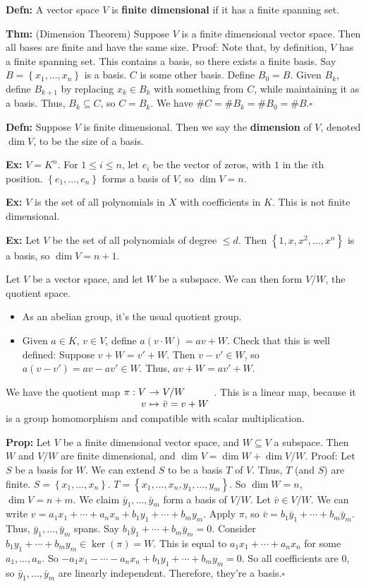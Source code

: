 \documentclass[10pt,letterpaper]{article}
\newcommand{\n}{\hfill\break}
\newcommand{\hangblock}[2]{\par\noindent\settowidth{\hangindent}{\textbf{#1: }}\textbf{#1: }\!\!\!#2}
\newcommand{\defn}[1]{\hangblock{Defn}{#1}}
\newcommand{\thm}[1]{\hangblock{Thm}{#1}}
\newcommand{\prop}[1]{\hangblock{Prop}{#1}}
\newcommand{\ex}[1]{\hangblock{Ex}{#1}}
\newcommand{\proven}{\;$\square$\n}
\newcommand{\set}[1]{\left\{#1\right\}}
\newcommand{\map}[4]{\!\!\!\begin{array}[t]{rcl}#1 & \!\!\!\!\to & \!\!\!\!#2\\ #3 & \!\!\!\!\mapsto & \!\!\!\!#4\end{array}}
\begin{document}
\defn{
	A vector space $V$ is \textbf{finite dimensional} if it has a finite spanning set.\n
}

\thm{
	(Dimension Theorem) Suppose $V$ is a finite dimensional vector space. Then all bases are finite and have the same size.\n
	Proof: Note that, by definition, $V$ has a finite spanning set. This contains a basis, so there exists a finite basis.\n
	Say $B=\set{x_{1},\ldots,x_{n}}$ is a basis. $C$ is some other basis. Define $B_{0}=B$. Given $B_{k}$, define $B_{k+1}$ by replacing $x_{k}\in{}B_{k}$ with something from $C$, while maintaining it as a basis.\n
	Thus, $B_{k}\subseteq{}C$, so $C=B_{k}$. We have $\#C=\#B_{k}=\#B_{0}=\#B$.\proven
}

\defn{
	Suppose $V$ is finite dimensional. Then we say the \textbf{dimension} of $V$, denoted $\dim{}V$, to be the size of a basis.\n
}

\ex{
	$V=K^{n}$. For $1\le{}i\le{}n$, let $e_{i}$ be the vector of zeros, with $1$ in the $i$th position. $\set{e_{1},\ldots,e_{n}}$ forms a basis of $V$, so $\dim{}V=n$.\n
}

\ex{
	$V$ is the set of all polynomials in $X$ with coefficients in $K$. This is not finite dimensional.\n
}

\ex{
	Let $V$ be the set of all polynomials of degree $\le{}d$. Then $\set{1,x,x^{2},\ldots,x^{n}}$ is a basis, so $\dim{}V=n+1$.\n
}

\par\noindent
Let $V$ be a vector space, and let $W$ be a subspace. We can then form $V/W$, the quotient space.
\begin{itemize}
	\item As an abelian group, it's the usual quotient group.
	\item Given $a\in{}K$, $v\in{}V$, define $a(v\cdot{}W)=av+W$. Check that this is well defined:\n
	Suppose $v+W=v'+W$. Then $v-v'\in{}W$, so $a(v-v')=av-av'\in{}W$. Thus, $av+W=av'+W$.
\end{itemize}

\par\noindent
We have the quotient map $\map{\pi:V}{V/W}{v}{\bar{v}=v+W}$.\n
This is a linear map, because it is a group homomorphism and compatible with scalar multiplication.\n

\prop{
	Let $V$ be a finite dimensional vector space, and $W\subseteq{}V$ a subspace. Then $W$ and $V/W$ are finite dimensional, and $\dim{}V=\dim{}W+\dim{}V/W$.\n
	Proof: Let $S$ be a basis for $W$. We can extend $S$ to be a basis $T$ of $V$. Thus, $T$ (and $S$) are finite. $S=\set{x_{1},\ldots,x_{n}}$. $T=\set{x_{1},\ldots,x_{n},y_{1},\ldots,y_{m}}$. So $\dim{}W=n$, $\dim{}V=n+m$.\n
	\n
	We claim $\bar{y}_{1},\ldots,\bar{y}_{m}$ form a basis of $V/W$. Let $\bar{v}\in{}V/W$. We can write\n
	$v=a_{1}x_{1}+\cdots+a_{n}x_{n}+b_{1}y_{1}+\cdots+b_{m}y_{m}$. Apply $\pi$, so $\bar{v}=b_{1}\bar{y}_{1}+\cdots+b_{m}\bar{y}_{m}$. Thus, $\bar{y}_{1},\ldots,\bar{y}_{m}$ spans.\n
	Say $b_{1}\bar{y}_{1}+\cdots+b_{m}\bar{y}_{m}=0$. Consider $b_{1}y_{1}+\cdots+b_{m}y_{m}\in\ker(\pi)=W$. This is equal to $a_{1}x_{1}+\cdots+a_{n}x_{n}$ for some $a_{1},\ldots,a_{n}$. So $-a_{1}x_{1}-\cdots-a_{n}x_{n}+b_{1}y_{1}+\cdots+b_{m}y_{m}=0$. So all coefficients are $0$, so $\bar{y}_{1},\ldots,\bar{y}_{m}$ are linearly independent.\n
	Therefore, they're a basis.\proven
}
\end{document}
